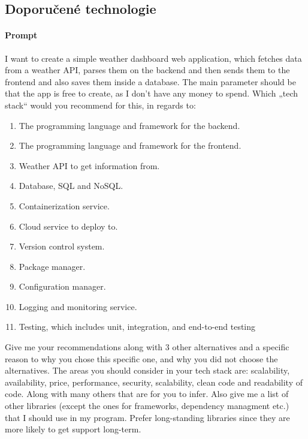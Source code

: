 \documentclass[FM,DP]{tulthesis}
\begin{document}
		\subsection{Doporučené technologie}
		\vspace{0.6em}
		\begin{tcolorbox}[colback=white,colframe=black]
			\paragraph{Prompt}
			I want to create a simple weather dashboard web application, which fetches data from a weather API, parses them on the backend and then sends them to the frontend and also saves them inside a database. The main parameter should be that the app is free to create, as I don't have any money to spend. Which „tech stack“ would you recommend for this, in regards to:
			\begin{enumerate}
				\item The programming language and framework for the backend.
				\item The programming language and framework for the frontend.
				\item Weather API to get information from.
				\item Database, SQL and NoSQL.
				\item Containerization service.
				\item Cloud service to deploy to.
				\item Version control system.
				\item Package manager.
				\item Configuration manager.
				\item Logging and monitoring service.
				\item Testing, which includes unit, integration, and end-to-end testing 
			\end{enumerate}
			
			Give me your recommendations along with 3 other alternatives and a specific reason to why you chose this specific one, and why you did not choose the alternatives. The areas you should consider in your tech stack are: scalability, availability, price, performance, security, scalability, clean code and readability of code. Along with many others that are for you to infer. Also give me a list of other libraries (except the ones for frameworks, dependency managment etc.) that I should use in my program. Prefer long-standing libraries since they are more likely to get support long-term.
			

\end{tcolorbox}
\end{document}
